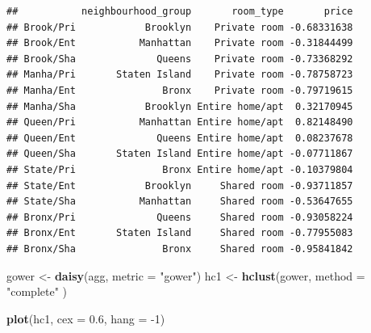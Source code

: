 \documentclass[
]{article}
\newenvironment{Shaded}{\begin{snugshade}}{\end{snugshade}}
\newcommand{\ControlFlowTok}[1]{\textcolor[rgb]{0.13,0.29,0.53}{\textbf{#1}}}
\newcommand{\DataTypeTok}[1]{\textcolor[rgb]{0.13,0.29,0.53}{#1}}
\newcommand{\DecValTok}[1]{\textcolor[rgb]{0.00,0.00,0.81}{#1}}
\newcommand{\FloatTok}[1]{\textcolor[rgb]{0.00,0.00,0.81}{#1}}
\newcommand{\KeywordTok}[1]{\textcolor[rgb]{0.13,0.29,0.53}{\textbf{#1}}}
\newcommand{\NormalTok}[1]{#1}
\newcommand{\OperatorTok}[1]{\textcolor[rgb]{0.81,0.36,0.00}{\textbf{#1}}}
\newcommand{\StringTok}[1]{\textcolor[rgb]{0.31,0.60,0.02}{#1}}
\begin{document}
\begin{Shaded}
\end{Shaded}

\begin{verbatim}
##           neighbourhood_group       room_type       price
## Brook/Pri            Brooklyn    Private room -0.68331638
## Brook/Ent           Manhattan    Private room -0.31844499
## Brook/Sha              Queens    Private room -0.73368292
## Manha/Pri       Staten Island    Private room -0.78758723
## Manha/Ent               Bronx    Private room -0.79719615
## Manha/Sha            Brooklyn Entire home/apt  0.32170945
## Queen/Pri           Manhattan Entire home/apt  0.82148490
## Queen/Ent              Queens Entire home/apt  0.08237678
## Queen/Sha       Staten Island Entire home/apt -0.07711867
## State/Pri               Bronx Entire home/apt -0.10379804
## State/Ent            Brooklyn     Shared room -0.93711857
## State/Sha           Manhattan     Shared room -0.53647655
## Bronx/Pri              Queens     Shared room -0.93058224
## Bronx/Ent       Staten Island     Shared room -0.77955083
## Bronx/Sha               Bronx     Shared room -0.95841842
\end{verbatim}

\begin{Shaded}
\begin{Highlighting}[]
\NormalTok{gower <-}\StringTok{ }\KeywordTok{daisy}\NormalTok{(agg, }\DataTypeTok{metric =} \StringTok{"gower"}\NormalTok{)}
\NormalTok{hc1 <-}\StringTok{ }\KeywordTok{hclust}\NormalTok{(gower, }\DataTypeTok{method =} \StringTok{"complete"}\NormalTok{ )}

\KeywordTok{plot}\NormalTok{(hc1, }\DataTypeTok{cex =} \FloatTok{0.6}\NormalTok{, }\DataTypeTok{hang =} \DecValTok{-1}\NormalTok{)}
\end{Highlighting}
\end{Shaded}
\end{document}
